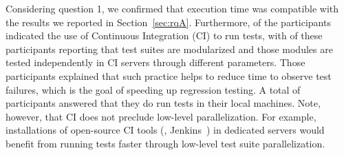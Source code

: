 
Considering question 1, we confirmed that execution time was
compatible with the results we reported in Section~\ref{sec:rqA}.
Furthermore, \emailsCI{} of the participants indicated the use of
Continuous Integration (CI) to run tests, with \emailsDistributed{} of
these participants reporting that test suites are modularized and
those modules are tested independently in CI servers through different
parameters.  Those participants explained that such practice helps to
reduce time to observe test failures, which is the goal of speeding up
regression testing.  A total of \emailsLocal{} participants answered
that they do run tests in their local machines.  Note, however, that
CI does not preclude low-level parallelization.  For example,
installations of open-source CI tools (\eg{}, Jenkins~\cite{jenkins})
in dedicated servers would benefit from running tests faster through
low-level test suite parallelization.


